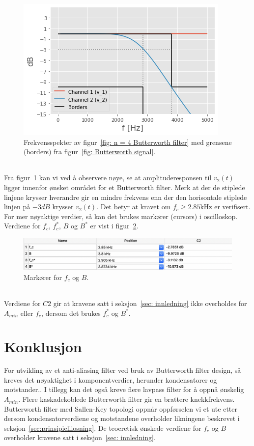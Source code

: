 \documentclass[a4paper,11pt,norsk]{article}
\begin{document}
\begin{figure}[!htbp]
    \centering
    \includegraphics{img/Butterworth.png}
    \caption{Frekvensspekter av figur~\ref{fig: n = 4 Butterworth filter} med grensene (borders) fra figur~\ref{fig: Butterworth signal}.}
    \label{fig: frekvensspekter}
\end{figure} \\
\newpage
Fra figur~\ref{fig: frekvensspekter} kan vi ved å observere nøye, se at amplituderesponsen til $v_2(t)$ ligger innenfor ønsket området for et Butterworth filter. Merk at der de stiplede linjene krysser hverandre gir en mindre frekvens enn der den horisontale stiplede linjen på $-3dB$ krysser $v_2(t)$. Det betyr at kravet om $f_c \geq 2.85$kHz er verifisert. For mer nøyaktige verdier, så kan det brukes markører (cursors) i oscilloskop. Verdiene for $f_c$, $f_c^*$, $B$ og $B^*$ er vist i figur~\ref{fig: markører}.
\begin{figure}[!htbp]
    \centering
    \includegraphics[width = 1.0 \textwidth]{img/Cursors_main.png}
    \caption{Markører for $f_c$ og $B$.}
    \label{fig: markører}
\end{figure}\\

Verdiene for $C2$ gir at kravene satt i seksjon~\ref{sec: innledning} ikke overholdes for $A_{min}$ eller $f_c$, dersom det brukes $f_c^*$ og $B^*$. \newpage
\section{Konklusjon}
\label{sec:konklusjon}
For utvikling av et anti-aliasing filter ved bruk av Butterworth filter design, så kreves det nøyaktighet i komponentverdier, herunder kondensatorer og motstander.. I tillegg kan det også kreve flere lavpass filter for å oppnå ønskelig $A_{min}$. Flere kaskadekoblede Butterworth filter gir en brattere knekkfrekvens. Butterworth filter med Sallen-Key topologi oppnår oppførselen vi et ute etter dersom kondensatorverdiene og motstandene overholder likningene beskrevet i seksjon~\ref{sec:prinsipielllosning}.
De teoeretisk ønskede verdiene for $f_c$ og $B$ overholder kravene satt i seksjon~\ref{sec: innledning}. 
\newpage
\end{document}
